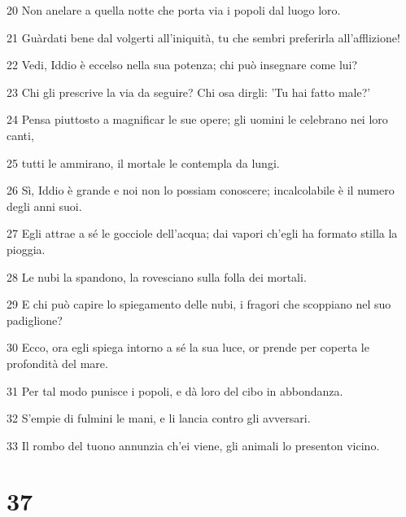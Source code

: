 \par 20 Non anelare a quella notte che porta via i popoli dal luogo loro.
\par 21 Guàrdati bene dal volgerti all'iniquità, tu che sembri preferirla all'afflizione!
\par 22 Vedi, Iddio è eccelso nella sua potenza; chi può insegnare come lui?
\par 23 Chi gli prescrive la via da seguire? Chi osa dirgli: 'Tu hai fatto male?'
\par 24 Pensa piuttosto a magnificar le sue opere; gli uomini le celebrano nei loro canti,
\par 25 tutti le ammirano, il mortale le contempla da lungi.
\par 26 Sì, Iddio è grande e noi non lo possiam conoscere; incalcolabile è il numero degli anni suoi.
\par 27 Egli attrae a sé le gocciole dell'acqua; dai vapori ch'egli ha formato stilla la pioggia.
\par 28 Le nubi la spandono, la rovesciano sulla folla dei mortali.
\par 29 E chi può capire lo spiegamento delle nubi, i fragori che scoppiano nel suo padiglione?
\par 30 Ecco, ora egli spiega intorno a sé la sua luce, or prende per coperta le profondità del mare.
\par 31 Per tal modo punisce i popoli, e dà loro del cibo in abbondanza.
\par 32 S'empie di fulmini le mani, e li lancia contro gli avversari.
\par 33 Il rombo del tuono annunzia ch'ei viene, gli animali lo presenton vicino.

\chapter{37}

